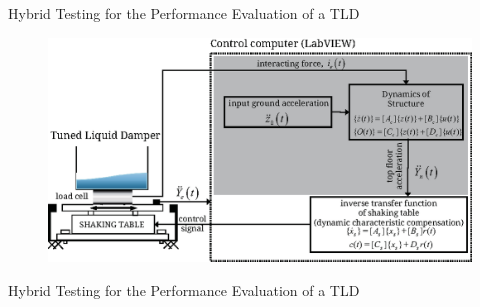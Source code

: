 \documentclass[usepdftitle=false]{beamer}
\begin{document}
\begin{frame}{Hybrid Testing for the Performance Evaluation of a TLD}
\begin{figure}[ht]
\centering
\includegraphics[width=1\textwidth] {figure/3-3.eps}
\label{fig:3-3}
\end{figure}
\end{frame}

\begin{frame}{Hybrid Testing for the Performance Evaluation of a TLD}
\begin{figure}[!ht]
\centering
\setcounter{subfigure}{0}
\end{figure}
\end{frame}
\end{document}
